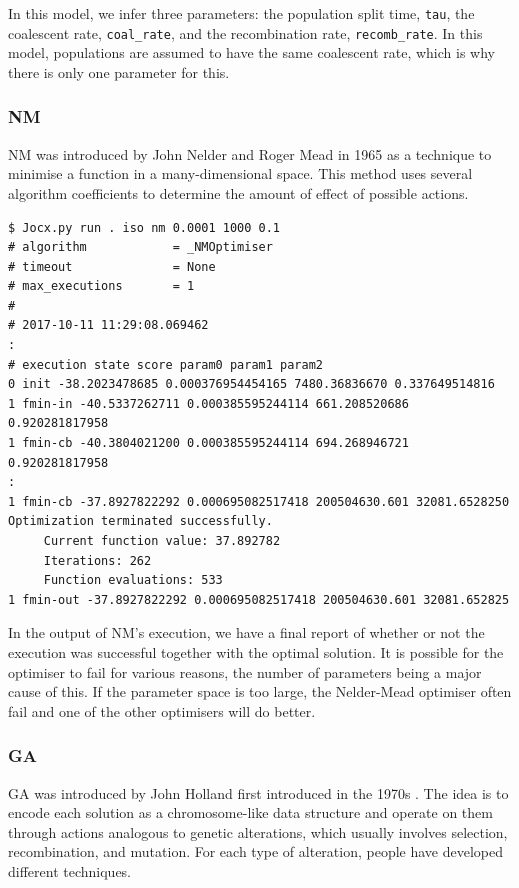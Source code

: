 \documentclass[graybox]{svmult}
\begin{document}
In this model, we infer three parameters: the population split time, \texttt{tau}, the coalescent rate, \texttt{coal\_rate}, and the recombination rate, \texttt{recomb\_rate}. In this model, populations are assumed to have the same coalescent rate, which is why there is only one parameter for this.

\subsubsection{NM}

NM was introduced by John Nelder and Roger Mead in 1965 \cite{nelder1965simplex} as a technique to minimise a function in a many-dimensional space. This method uses several algorithm coefficients to determine the amount of effect of possible actions.

 {\scriptsize{}\begin{verbatim}
$ Jocx.py run . iso nm 0.0001 1000 0.1
# algorithm            = _NMOptimiser
# timeout              = None
# max_executions       = 1
#
# 2017-10-11 11:29:08.069462
:
# execution state score param0 param1 param2
0 init -38.2023478685 0.000376954454165 7480.36836670 0.337649514816
1 fmin-in -40.5337262711 0.000385595244114 661.208520686 0.920281817958
1 fmin-cb -40.3804021200 0.000385595244114 694.268946721 0.920281817958
:
1 fmin-cb -37.8927822292 0.000695082517418 200504630.601 32081.6528250
Optimization terminated successfully.
     Current function value: 37.892782
     Iterations: 262
     Function evaluations: 533
1 fmin-out -37.8927822292 0.000695082517418 200504630.601 32081.652825
\end{verbatim}}

In the output of NM's execution, we have a final report of whether or not the execution was successful together with the optimal solution. It is possible for the optimiser to fail for various reasons, the number of parameters being a major cause of this. If the parameter space is too large, the Nelder-Mead optimiser often fail and one of the other optimisers will do better.

\subsubsection{GA}

GA was introduced by John Holland first introduced in the 1970s \cite{holland1992genetic}. The idea is to encode each solution as a chromosome-like data structure and operate on them through actions analogous to genetic alterations, which usually involves selection, recombination, and mutation. For each type of alteration, people have developed different techniques.
\end{document}
